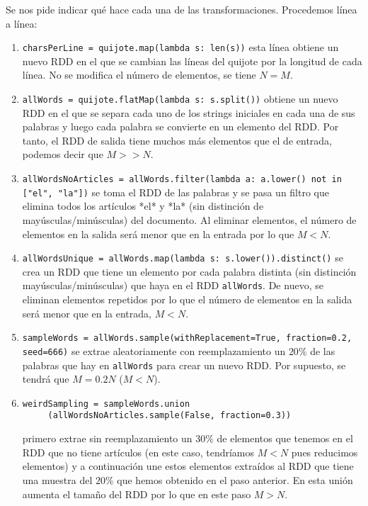 \documentclass[11pt]{article}
\def\inline{\lstinline[basicstyle=\ttfamily,keywordstyle={}]}
\begin{document}
Se nos pide indicar qué hace cada una de las transformaciones. Procedemos línea a línea:

\begin{enumerate}
	\item \inline{charsPerLine = quijote.map(lambda s: len(s))} esta línea obtiene un nuevo RDD en el que se cambian las líneas del quijote por la longitud de cada línea. No se modifica el número de elementos, se tiene $N = M$.
	
	\item \inline{allWords = quijote.flatMap(lambda s: s.split())} obtiene un nuevo RDD en el que se separa cada uno de los strings iniciales en cada una de sus palabras y luego cada palabra se convierte en un elemento del RDD. Por tanto, el RDD de salida tiene muchos más elementos que el de entrada, podemos decir que $M >> N$.
	
	\item \inline{allWordsNoArticles = allWords.filter(lambda a: a.lower() not in ["el", "la"])} se toma el RDD de las palabras y se pasa un filtro que elimina todos los artículos *el* y *la* (sin distinción de mayúsculas/minúsculas) del documento. Al eliminar elementos, el número de elementos en la salida será menor que en la entrada por lo que $M < N$.
	
	\item \inline{allWordsUnique = allWords.map(lambda s: s.lower()).distinct()} se crea un RDD que tiene un elemento por cada palabra distinta (sin distinción mayúsculas/minúsculas) que haya en el RDD \inline{allWords}. De nuevo, se eliminan elementos repetidos por lo que el número de elementos en la salida será menor que en la entrada, $M < N$.
	
	\item \inline{sampleWords = allWords.sample(withReplacement=True, fraction=0.2, seed=666)} se extrae aleatoriamente con reemplazamiento un $20\%$ de las palabras que hay en \inline{allWords} para crear un nuevo RDD. Por supuesto, se tendrá que $M = 0.2 N$ ($M < N$).
	
	\item \begin{verbatim}
weirdSampling = sampleWords.union
     (allWordsNoArticles.sample(False, fraction=0.3))
		\end{verbatim} 
		primero extrae sin reemplazamiento un $30\%$ de elementos que tenemos en el RDD que no tiene artículos (en este caso, tendríamos $M < N$ pues reducimos elementos) y a continuación une estos elementos extraídos al RDD que tiene una muestra del $20\%$ que hemos obtenido en el paso anterior. En esta unión aumenta el tamaño del RDD por lo que en este paso $M > N$.
\end{enumerate}
\end{document}
